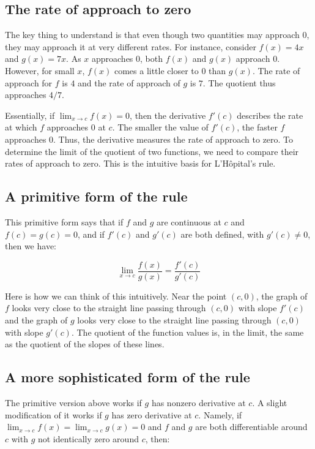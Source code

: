 \documentclass{amsart}
\begin{document}
\subsection{The rate of approach to zero}

The key thing to understand is that even though two quantities may
approach $0$, they may approach it at very different rates. For
instance, consider $f(x) = 4x$ and $g(x) = 7x$. As $x$ approaches $0$,
both $f(x)$ and $g(x)$ approach $0$. However, for small $x$, $f(x)$
comes a little closer to $0$ than $g(x)$. The rate of approach for $f$
is $4$ and the rate of approach of $g$ is $7$. The quotient thus
approaches $4/7$.

Essentially, if $\lim_{x \to c} f(x) = 0$, then the derivative $f'(c)$
describes the rate at which $f$ approaches $0$ at $c$. The smaller the
value of $f'(c)$, the faster $f$ approaches $0$. Thus, the derivative
measures the rate of approach to zero. To determine the limit of the
quotient of two functions, we need to compare their rates of approach
to zero. This is the intuitive basis for L'H\^{o}pital's rule.

\subsection{A primitive form of the rule}

This primitive form says that if $f$ and $g$ are continuous at $c$ and
$f(c) = g(c) = 0$, and if $f'(c)$ and $g'(c)$ are both defined, with $g'(c)
\ne 0$, then we have:

$$\lim_{x \to c} \frac{f(x)}{g(x)} = \frac{f'(c)}{g'(c)}$$

Here is how we can think of this intuitively. Near the point $(c,0)$,
the graph of $f$ looks very close to the straight line passing through
$(c,0)$ with slope $f'(c)$ and the graph of $g$ looks very close to
the straight line passing through $(c,0)$ with slope $g'(c)$. The
quotient of the function values is, in the limit, the same as the
quotient of the slopes of these lines.

\subsection{A more sophisticated form of the rule}

The primitive version above works if $g$ has nonzero derivative at
$c$. A slight modification of it works if $g$ has zero derivative at
$c$. Namely, if $\lim_{x \to c} f(x) = \lim_{x \to c} g(x) = 0$ and $f$
and $g$ are both differentiable around $c$ with $g$ not identically
zero around $c$, then:
\end{document}
